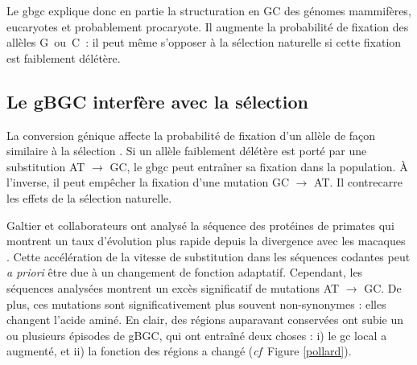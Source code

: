 \documentclass[11pt, oneside]{scrartcl}
\begin{document}
\begin{transition}
  Le \ac{gbgc} explique donc en partie la structuration en GC des génomes
  mammifères, eucaryotes et probablement procaryote. Il augmente la probabilité
  de fixation des allèles G ou C : il peut même s'opposer à la sélection
  naturelle si cette fixation est faiblement délétère.  
\end{transition}


\subsection{Le gBGC interfère avec la sélection}
\label{sec:orgheadline15}
La conversion génique affecte la probabilité de fixation d'un allèle de façon
similaire à la sélection \cite{nagylaki_evolution_1983}. Si un allèle faiblement
délétère est porté par une substitution AT \(\rightarrow\) GC, le \ac{gbgc} peut
entraîner sa fixation dans la population. À l'inverse, il peut empêcher la
fixation d'une mutation GC \(\rightarrow\) AT. Il contrecarre les effets de la
sélection naturelle.

Galtier et collaborateurs ont analysé la séquence des protéines de primates qui
montrent un taux d'évolution plus rapide depuis la divergence avec les macaques
\cite{galtier_gc-biased_2009}. Cette accélération de la vitesse de substitution
dans les séquences codantes peut \emph{a priori} être due à un changement de fonction
adaptatif. Cependant, les séquences analysées montrent un excès significatif
de mutations AT \(\rightarrow\) GC. De plus, ces mutations sont significativement
plus souvent non-synonymes : elles changent l'acide aminé. En clair, des régions
auparavant conservées ont subie un ou plusieurs épisodes de gBGC, qui ont
entraîné deux choses : i) le \ac{gc} local a augmenté, et ii) la fonction des
régions a changé (\emph{cf} Figure \ref{pollard}).
\end{document}
